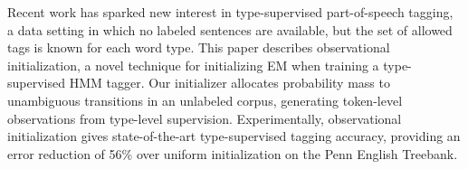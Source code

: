 Recent work has sparked new interest in type-supervised part-of-speech tagging, a data setting in which no labeled sentences are available, but the set of allowed tags is known for each word type. This paper describes observational initialization, a novel technique for initializing EM when training a type-supervised HMM tagger. Our initializer allocates probability mass to unambiguous transitions in an unlabeled corpus, generating token-level observations from type-level supervision.  Experimentally, observational initialization gives state-of-the-art type-supervised tagging accuracy, providing an error reduction of 56\% over uniform initialization on the Penn English Treebank.
